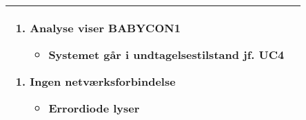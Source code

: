 \begin{center}
\begin{longtable}{|p{5cm}|p{9cm}|}
\begin{enumerate}[label=\ref{kravspec:uc3_lydanalyse}.c]
\begin{itemize}
					\end{itemize}
			\end{enumerate}
			\begin{enumerate}[label=\ref{kravspec:uc3_lydanalyse}.d]
			\item Analyse viser BABYCON1
					\begin{itemize}
					\item Systemet går i undtagelsestilstand jf. UC4
					\end{itemize}
			\end{enumerate}
			\begin{enumerate}[label=\ref{kravspec:uc3_opdatering}.a]
			\item Ingen netværksforbindelse
					\begin{itemize}				
						\item Errordiode lyser
					\end{itemize}
			\end{enumerate}
		\\\hline
	\end{longtable} 
\end{center}


